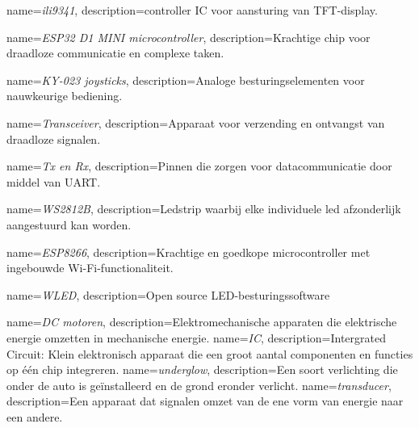 {
    name=\textit{ili9341},
    description={controller IC voor aansturing van TFT-display.}
}

{
    name=\textit{ESP32 D1 MINI microcontroller},
    description={Krachtige chip voor draadloze communicatie en complexe taken.}
}

{
    name=\textit{KY-023 joysticks},
    description={Analoge besturingselementen voor nauwkeurige bediening.}
}

{
    name=\textit{Transceiver},
    description={Apparaat voor verzending en ontvangst van draadloze signalen.}
}

{
    name=\textit{Tx en Rx},
    description={Pinnen die zorgen voor datacommunicatie door middel van UART.}
}

{
    name=\textit{WS2812B},
    description={Ledstrip waarbij elke individuele led afzonderlijk aangestuurd kan worden.}
}

{
    name=\textit{ESP8266},
    description={Krachtige en goedkope microcontroller met ingebouwde Wi-Fi-functionaliteit.}
}

{
    name=\textit{WLED},
    description={Open source LED-besturingssoftware}
}

{
    name=\textit{DC motoren},
    description={Elektromechanische apparaten die elektrische energie omzetten in mechanische energie.}
}
{
    name=\textit{IC},
    description={Intergrated Circuit: Klein elektronisch apparaat die een groot aantal componenten en functies op één chip integreren.}
}
{
    name=\textit{underglow},
    description={Een soort verlichting die onder de auto is geïnstalleerd en de grond eronder verlicht.}
}
{
    name=\textit{transducer},
    description={Een apparaat dat signalen omzet van de ene vorm van energie naar een andere.}
}
